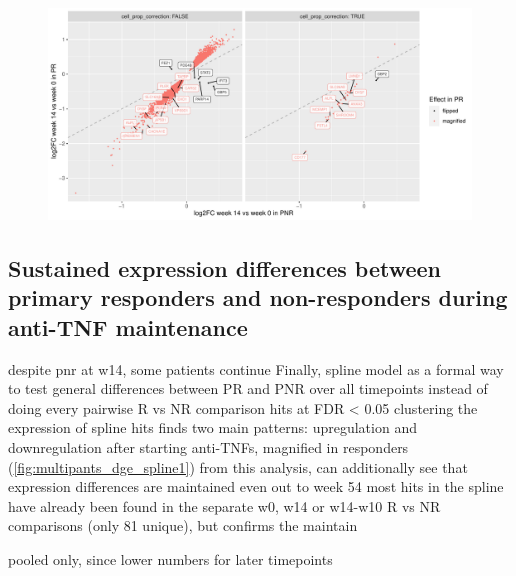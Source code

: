 \begin{outline}
\begin{figure}
    \centering
    \includegraphics[width=1.0\textwidth,page=1]{mainmatter/figures/chapter_04/plot_gene_set_enrichment.logFC_C_3R_1R_vs_logFC_C_3N_1N.pdf}
    \caption{}
    \label{fig:multipants_dge_logFC_C_3R_1R_vs_logFC_C_3N_1N}
\end{figure}

\subsection{Sustained expression differences between primary responders and non-responders during anti-\gls{TNF} maintenance}

\1 despite pnr at w14, some patients continue
\1 Finally, spline model as a formal way to test general differences between PR and PNR over all timepoints
    \2 instead of doing every pairwise R vs NR comparison
     hits at FDR < 0.05
    \2 clustering the expression of spline hits finds two main patterns: upregulation and downregulation after starting anti-TNFs, magnified in responders (\autoref{fig:multipants_dge_spline1})
    \2 from this analysis, can additionally see that expression differences are maintained even out to week 54
    \2 most hits in the spline have already been found in the separate w0, w14 or w14-w10 R vs NR comparisons (only 81 unique), but confirms the maintain

pooled only, since lower numbers for later timepoints


\end{outline}
